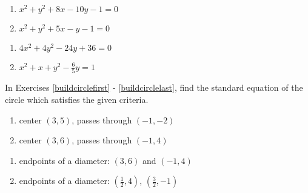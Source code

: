 \begin{multicols}{2}
\begin{enumerate}
\setcounter{enumi}{\value{HW}}


\item $x^2+y^2+8x-10y -1 =0$
\item $x^2+y^2+5x-y-1=0$

\setcounter{HW}{\value{enumi}}
\end{enumerate}
\end{multicols}

\begin{multicols}{2}
\begin{enumerate}
\setcounter{enumi}{\value{HW}}


\item $4x^{2} + 4y^{2} - 24y + 36 = 0$
\item $x^{2} + x + y^{2} - \frac{6}{5}y = 1$  \label{ctscirclelast}

\setcounter{HW}{\value{enumi}}
\end{enumerate}
\end{multicols}

In Exercises \ref{buildcirclefirst} - \ref{buildcirclelast}, find the standard equation of the circle which satisfies the given criteria.

\begin{multicols}{2}
\begin{enumerate}
\setcounter{enumi}{\value{HW}}

\item center $(3, 5)$,  passes through $(-1, -2)$ \label{buildcirclefirst}

\item  center $(3, 6)$,  passes through  $(-1, 4)$

\setcounter{HW}{\value{enumi}}
\end{enumerate}
\end{multicols}

\begin{multicols}{2}
\begin{enumerate}
\setcounter{enumi}{\value{HW}}

\item  endpoints of a diameter: $(3,6)$ and $(-1,4)$

\item endpoints of a diameter:  $\left( \frac{1}{2}, 4\right)$, $\left(\frac{3}{2}, -1\right)$  \label{buildcirclelast}

\setcounter{HW}{\value{enumi}}
\end{enumerate}
\end{multicols}



